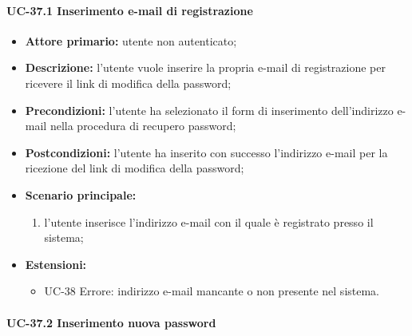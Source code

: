 \paragraph{UC-37.1 Inserimento e-mail di registrazione}

	\begin{itemize}
		\item \textbf{Attore primario:} utente non autenticato;

		\item \textbf{Descrizione:} l'utente vuole inserire la propria e-mail di registrazione per ricevere il link di modifica della password;

		\item \textbf{Precondizioni:} l'utente ha selezionato il form di inserimento dell'indirizzo e-mail nella procedura di recupero password;

		\item \textbf{Postcondizioni:} l'utente ha inserito con successo l'indirizzo e-mail per la ricezione del link di modifica della password;

		\item \textbf{Scenario principale:}
	  		\begin{enumerate}
		  		\item l'utente inserisce l'indirizzo e-mail con il quale è registrato presso il sistema; 
	  		\end{enumerate}
	  	\item \textbf{Estensioni:}
	  		\begin{itemize}
		  		\item UC-38 Errore: indirizzo e-mail mancante o non presente nel sistema.
	  		\end{itemize}
		\end{itemize}

\paragraph{UC-37.2 Inserimento nuova password}


